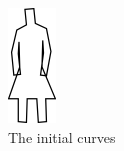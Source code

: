 \begin{figure}
\includegraphics[width=\linewidth]{output/1.models/hand_built/romer_skirt.png}
\caption{The initial curves}
\end{figure}

